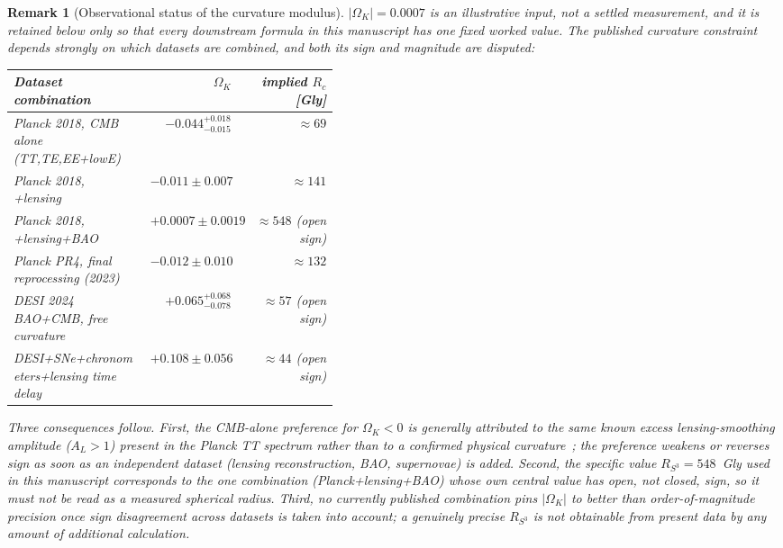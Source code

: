 \documentclass[11pt,a4paper]{article}
\newtheorem{remark}[theorem]{Remark}
\begin{document}
\begin{remark}[Observational status of the curvature modulus]
\label{rem:curvature-status}
$|\Omega_K|=0.0007$ is an illustrative input, not a settled measurement, and it is retained below only so that every downstream formula in this manuscript has one fixed worked value.  The published curvature constraint depends strongly on which datasets are combined, and both its sign and magnitude are disputed:
\begin{center}
\small
\begin{tabular}{p{0.42\linewidth}rr}
\toprule
Dataset combination & $\Omega_K$ & implied $R_c$ [Gly]\\
\midrule
Planck 2018, CMB alone (TT,TE,EE+lowE)~\cite{Planck2018VI,DiValentino2019} & $-0.044^{+0.018}_{-0.015}$ & $\approx69$\\
Planck 2018, +lensing~\cite{Planck2018VI} & $-0.011\pm0.007$ & $\approx141$\\
Planck 2018, +lensing+BAO~\cite{Planck2018VI} & $+0.0007\pm0.0019$ & $\approx548$ (open sign)\\
Planck PR4, final reprocessing (2023)~\cite{TristramPR4} & $-0.012\pm0.010$ & $\approx132$\\
DESI 2024 BAO+CMB, free curvature~\cite{DESI2024VI} & $+0.065^{+0.068}_{-0.078}$ & $\approx57$ (open sign)\\
DESI+SNe+chronometers+lensing time delay~\cite{Zhai2024} & $+0.108\pm0.056$ & $\approx44$ (open sign)\\
\bottomrule
\end{tabular}
\end{center}
Three consequences follow. First, the CMB-alone preference for $\Omega_K<0$ is generally attributed to the same known excess lensing-smoothing amplitude ($A_L>1$) present in the Planck TT spectrum rather than to a confirmed physical curvature~\cite{EfstathiouGratton2020,Handley2021}; the preference weakens or reverses sign as soon as an independent dataset (lensing reconstruction, BAO, supernovae) is added. Second, the specific value $R_{S^3}=548$~Gly used in this manuscript corresponds to the one combination (Planck+lensing+BAO) whose own central value has open, not closed, sign, so it must not be read as a measured spherical radius. Third, no currently published combination pins $|\Omega_K|$ to better than order-of-magnitude precision once sign disagreement across datasets is taken into account; a genuinely precise $R_{S^3}$ is not obtainable from present data by any amount of additional calculation.
\end{remark}
\end{document}
